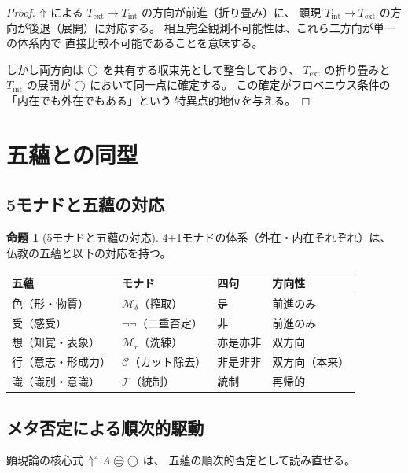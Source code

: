 \documentclass[11pt,a4paper]{article}
\newcommand{\Mr}{\mathcal{M}_r}
\newcommand{\Md}{\mathcal{M}_\delta}
\newcommand{\Mnn}{\neg\neg}
\newcommand{\MC}{\mathcal{C}}
\newcommand{\MT}{\mathcal{T}}
\newcommand{\Text}{T_{\mathrm{ext}}}
\newcommand{\Tint}{T_{\mathrm{int}}}
\theoremstyle{definition}
\newtheorem{proposition}{命題}[section]
\begin{document}
\begin{proof}
$\Uparrow$ による $\Text \to \Tint$ の方向が前進（折り畳み）に、
顕現 $\Tint \to \Text$ の方向が後退（展開）に対応する。
相互完全観測不可能性は、これら二方向が単一の体系内で
直接比較不可能であることを意味する。

しかし両方向は $\bigcirc$ を共有する収束先として整合しており、
$\Text$ の折り畳みと $\Tint$ の展開が $\bigcirc$ において同一点に確定する。
この確定がフロベニウス条件の「内在でも外在でもある」という
特異点的地位を与える。
\end{proof}

\section{五蘊との同型}
\label{sec:skandha}

\subsection{5モナドと五蘊の対応}

\begin{proposition}[5モナドと五蘊の対応]
4+1モナドの体系（外在・内在それぞれ）は、
仏教の五蘊と以下の対応を持つ。

\begin{center}
\begin{tabular}{llll}
\hline
\textbf{五蘊} & \textbf{モナド} & \textbf{四句} & \textbf{方向性} \\
\hline
色（形・物質） & $\Md$（搾取） & 是 & 前進のみ \\
受（感受） & $\Mnn$（二重否定） & 非 & 前進のみ \\
想（知覚・表象） & $\Mr$（洗練） & 亦是亦非 & 双方向 \\
行（意志・形成力） & $\MC$（カット除去） & 非是非非 & 双方向（本来） \\
識（識別・意識） & $\MT$（統制） & 統制 & 再帰的 \\
\hline
\end{tabular}
\end{center}
\end{proposition}

\subsection{メタ否定による順次的駆動}

顕現論の核心式 $\metanegation^4 A \mweq \dfix$ は、
五蘊の順次的否定として読み直せる。
\end{document}
